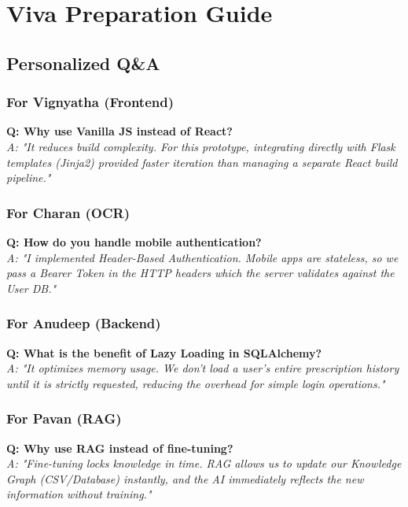 \documentclass[a4paper,12pt]{report}
\begin{document}
\newpage

\part{Viva Preparation Guide}

\chapter{Personalized Q\&A}

\section{For Vignyatha (Frontend)}
\textbf{Q: Why use Vanilla JS instead of React?} \\
\textit{A: "It reduces build complexity. For this prototype, integrating directly with Flask templates (Jinja2) provided faster iteration than managing a separate React build pipeline."}

\section{For Charan (OCR)}
\textbf{Q: How do you handle mobile authentication?} \\
\textit{A: "I implemented Header-Based Authentication. Mobile apps are stateless, so we pass a Bearer Token in the HTTP headers which the server validates against the User DB."}

\section{For Anudeep (Backend)}
\textbf{Q: What is the benefit of Lazy Loading in SQLAlchemy?} \\
\textit{A: "It optimizes memory usage. We don't load a user's entire prescription history until it is strictly requested, reducing the overhead for simple login operations."}

\section{For Pavan (RAG)}
\textbf{Q: Why use RAG instead of fine-tuning?} \\
\textit{A: "Fine-tuning locks knowledge in time. RAG allows us to update our Knowledge Graph (CSV/Database) instantly, and the AI immediately reflects the new information without training."}
\end{document}
